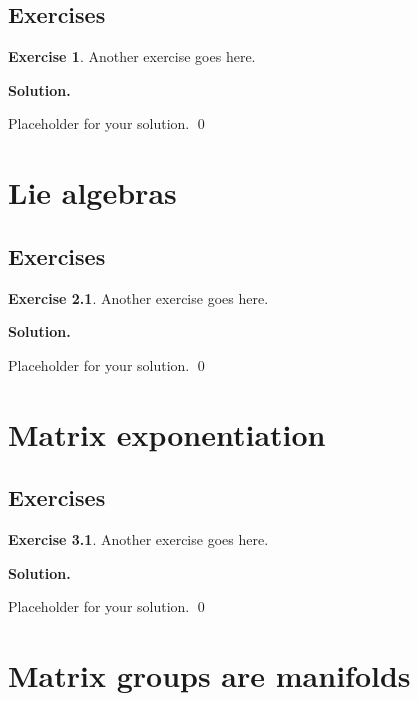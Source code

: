 \documentclass[12pt]{book}
\theoremstyle{definition}
\newtheorem{exercise}{Exercise}[chapter]
\newenvironment{solution}
{%
  \par\noindent\textbf{Solution.}\quad
}
{%
  \qed\par
}
\begin{document}
\section{Exercises}

\begin{exercise}
Another exercise goes here.
\end{exercise}

\begin{solution}
Placeholder for your solution.
\end{solution}

\chapter{Lie algebras}
\section{Exercises}

\begin{exercise}
Another exercise goes here.
\end{exercise}

\begin{solution}
Placeholder for your solution.
\end{solution}

\chapter{Matrix exponentiation}
\section{Exercises}

\begin{exercise}
Another exercise goes here.
\end{exercise}

\begin{solution}
Placeholder for your solution.
\end{solution}

\chapter{Matrix groups are manifolds}
\end{document}
